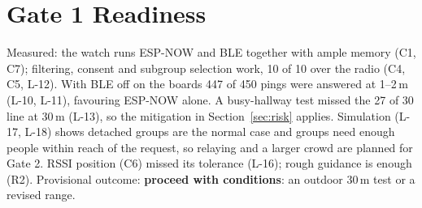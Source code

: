 \IfFileExists{IEEEtran.cls}{\documentclass[conference]{IEEEtran}}{\documentclass[10pt,twocolumn]{article}}
\begin{document}
\section{Gate 1 Readiness}
Measured: the watch runs ESP-NOW and BLE together with ample memory (C1, C7); filtering, consent and subgroup selection work, 10 of 10 over the radio (C4, C5, L-12). With BLE off on the boards 447 of 450 pings were answered at 1--2\,m (L-10, L-11), favouring ESP-NOW alone. A busy-hallway test missed the 27 of 30 line at 30\,m (L-13), so the mitigation in Section~\ref{sec:risk} applies. Simulation (L-17, L-18) shows detached groups are the normal case and groups need enough people within reach of the request, so relaying and a larger crowd are planned for Gate 2. RSSI position (C6) missed its tolerance (L-16); rough guidance is enough (R2). Provisional outcome: \textbf{proceed with conditions}: an outdoor 30\,m test or a revised range.

\end{document}
